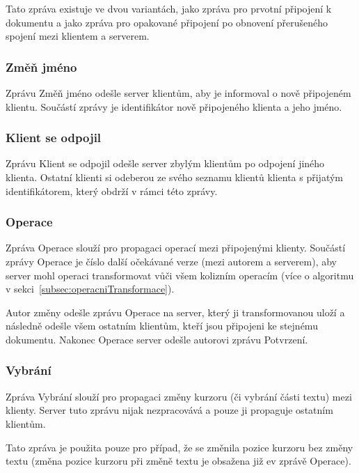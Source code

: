 Tato zpráva existuje ve dvou variantách, jako zpráva pro prvotní připojení k dokumentu a jako zpráva pro opakované připojení po obnovení přerušeného spojení mezi klientem a serverem.

\subsubsection{Změň jméno} %

Zprávu Změň jméno odešle server klientům, aby je informoval o nově připojeném klientu.
Součástí zprávy je identifikátor nově připojeného klienta a jeho jméno.

\subsubsection{Klient se odpojil} %

Zprávu Klient se odpojil odešle server zbylým klientům po odpojení jiného klienta.
Ostatní klienti si odeberou ze svého seznamu klientů klienta s přijatým identifikátorem, který obdrží v rámci této zprávy.

\subsubsection{Operace} %

Zpráva Operace slouží pro propagaci operací mezi připojenými klienty.
Součástí zprávy Operace je číslo další očekávané verze (mezi autorem a serverem), aby server mohl operaci transformovat vůči všem kolizním operacím (více o algoritmu v sekci~\ref{subsec:operacniTransformace}).

Autor změny odešle zprávu Operace na server, který ji transformovanou uloží a následně odešle všem ostatním klientům, kteří jsou připojeni ke stejnému dokumentu.
Nakonec Operace server odešle autorovi zprávu Potvrzení.

\subsubsection{Vybrání} %

Zpráva Vybrání slouží pro propagaci změny kurzoru (či vybrání části textu) mezi klienty.
Server tuto zprávu nijak nezpracovává a pouze ji propaguje ostatním klientům.

Tato zpráva je použita pouze pro případ, že se změnila pozice kurzoru bez změny textu (změna pozice kurzoru při změně textu je obsažena již ev zprávě Operace).

